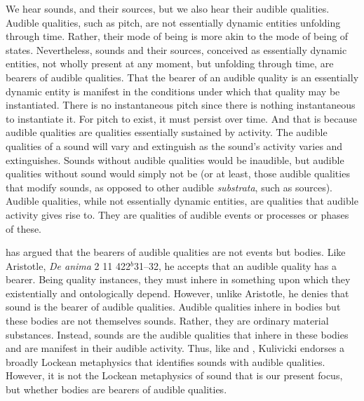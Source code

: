 \documentclass[12pt]{article}
\begin{document}
We hear sounds, and their sources, but we also hear their audible qualities. Audible qualities, such as pitch, are not essentially dynamic entities unfolding through time. Rather, their mode of being is more akin to the mode of being of states. Nevertheless, sounds and their sources, conceived as essentially dynamic entities, not wholly present at any moment, but unfolding through time, are bearers of audible qualities. That the bearer of an audible quality is an essentially dynamic entity is manifest in the conditions under which that quality may be instantiated. There is no instantaneous pitch since there is nothing instantaneous to instantiate it. For pitch to exist, it must persist over time. And that is because audible qualities are qualities essentially sustained by activity. The audible qualities of a sound will vary and extinguish as the sound’s activity varies and extinguishes. Sounds without audible qualities would be inaudible, but audible qualities without sound would simply not be (or at least, those audible qualities that modify sounds, as opposed to other audible \emph{substrata}, such as sources). Audible qualities, while not essentially dynamic entities, are qualities that audible activity gives rise to. They are qualities of audible events or processes or phases of these.




\citet{Kulvicki:2008aa} has argued that the bearers of audible qualities are not events but bodies. Like Aristotle, \emph{De anima} 2 11 422\( ^{b} \)31–32, he accepts that an audible quality has a bearer. Being quality instances, they must inhere in something upon which they existentially and ontologically depend. However, unlike Aristotle, he denies that sound is the bearer of audible qualities. Audible qualities inhere in bodies but these bodies are not themselves sounds. Rather, they are ordinary material substances. Instead, sounds are the audible qualities that inhere in these bodies and are manifest in their audible activity. Thus, like \citet{Pasnau:1999ss} and \citet{Leddington:2014aa}, Kulivicki endorses a broadly Lockean metaphysics that identifies sounds with audible qualities. However, it is not the Lockean metaphysics of sound that is our present focus, but whether bodies are bearers of audible qualities.
\end{document}
